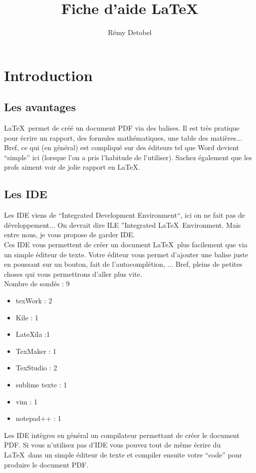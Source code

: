 \documentclass[a4paper,11pt]{article}
\title{Fiche d'aide \LaTeX}
\author{Rémy Detobel}
\begin{document}
\maketitle

\newpage
\tableofcontents
\newpage


\section{Introduction}
  \subsection{Les avantages}
    \LaTeX\ permet de créé un document PDF via des balises.  Il est très pratique pour écrire un rapport, des formules mathématiques, une table des matières...  Bref, ce qui (en général) est compliqué sur des éditeurs tel que Word devient ``simple'' ici (lorsque l'on a pris l'habitude de l'utiliser).  Sachez également que les profs aiment voir de jolie rapport en \LaTeX.
    
  \subsection{Les IDE}
    Les IDE viens de ``Integrated Development Environment``, ici on ne fait pas de développement...  On devrait dire ILE ''Integrated \LaTeX\ Environment.  Mais entre nous, je vous propose de garder IDE.\\
    Ces IDE vous permettent de créer un document \LaTeX\ plus facilement que via un simple éditeur de texte.  Votre éditeur vous permet d'ajouter une balise juste en poussant sur un bouton, fait de l'autocomplétion, ...  Bref, pleins de petites choses qui vous permettrons d'aller plus vite.\\
    Nombre de sondés : 9
    \begin{itemize}
      \item texWork : 2
      \item Kile : 1
      \item LateXila :1
      \item TexMaker : 1
      \item TexStudio : 2
      \item sublime texte : 1
      \item vim : 1
      \item notepad++ : 1
    \end{itemize}
    Les IDE intègres en général un compilateur permettant de créer le document PDF.  Si vous n'utilisez pas d'IDE vous pouvez tout de même écrire du \LaTeX\ dans un simple éditeur de texte et compiler ensuite votre ``code'' pour produire le document PDF.
    
\end{document}
